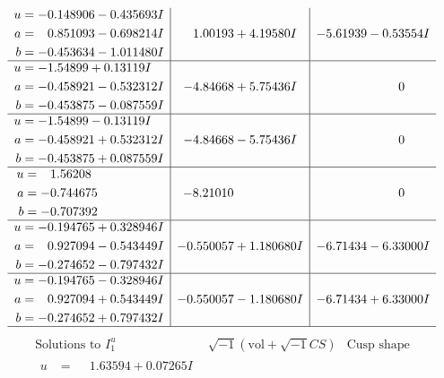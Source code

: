 \documentclass[1p]{elsarticle_modified}
\theoremstyle{definition}
\newcommand{\I}{\sqrt{-1}}
\begin{document}
$$\begin{array}{c|c|c}
\begin{aligned}
u &= -0.148906 - 0.435693 I \\
a &= \phantom{-}0.851093 - 0.698214 I \\
b &= -0.453634 - 1.011480 I\end{aligned}
 & \phantom{-}1.00193 + 4.19580 I & -5.61939 - 0.53554 I \\ \hline\begin{aligned}
u &= -1.54899 + 0.13119 I \\
a &= -0.458921 - 0.532312 I \\
b &= -0.453875 - 0.087559 I\end{aligned}
 & -4.84668 + 5.75436 I & \phantom{-0.000000 } 0 \\ \hline\begin{aligned}
u &= -1.54899 - 0.13119 I \\
a &= -0.458921 + 0.532312 I \\
b &= -0.453875 + 0.087559 I\end{aligned}
 & -4.84668 - 5.75436 I & \phantom{-0.000000 } 0 \\ \hline\begin{aligned}
u &= \phantom{-}1.56208\phantom{ +0.000000I} \\
a &= -0.744675\phantom{ +0.000000I} \\
b &= -0.707392\phantom{ +0.000000I}\end{aligned}
 & -8.21010\phantom{ +0.000000I} & \phantom{-0.000000 } 0 \\ \hline\begin{aligned}
u &= -0.194765 + 0.328946 I \\
a &= \phantom{-}0.927094 - 0.543449 I \\
b &= -0.274652 - 0.797432 I\end{aligned}
 & -0.550057 + 1.180680 I & -6.71434 - 6.33000 I \\ \hline\begin{aligned}
u &= -0.194765 - 0.328946 I \\
a &= \phantom{-}0.927094 + 0.543449 I \\
b &= -0.274652 + 0.797432 I\end{aligned}
 & -0.550057 - 1.180680 I & -6.71434 + 6.33000 I\\
 \hline 
 \end{array}$$\newpage$$\begin{array}{c|c|c}  
\text{Solutions to }I^u_{1}& \I (\text{vol} + \sqrt{-1}CS) & \text{Cusp shape}\\
 \hline 
\begin{aligned}
u &= \phantom{-}1.63594 + 0.07265 I \\

\end{aligned}
\end{array}$$
\end{document}
